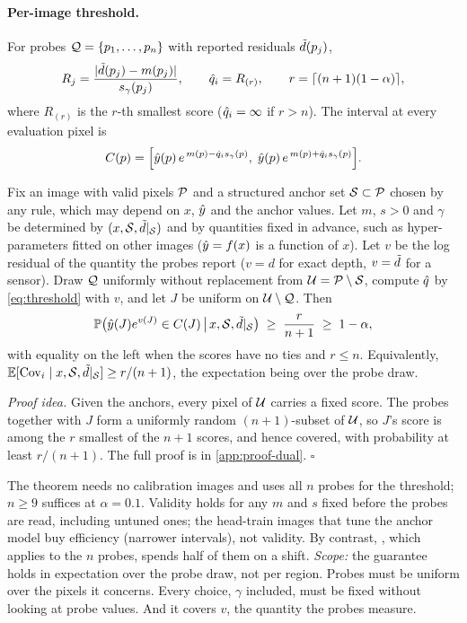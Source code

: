 \paragraph{Per-image threshold.}
For probes $\mathcal{Q}=\{p_1,\dots,p_n\}$ with reported residuals $\tilde{d}(p_j)$,
\begin{equation}
R_j=\frac{|\tilde{d}(p_j)-m(p_j)|}{s_\gamma(p_j)},\qquad\hat{q}_i=R_{(r)},\qquad r=\lceil(n+1)(1-\alpha)\rceil,
\label{eq:threshold}
\end{equation}
where $R_{(r)}$ is the $r$-th smallest score ($\hat{q}_i=\infty$ if $r>n$).
The interval at every evaluation pixel is
\begin{equation}
C(p)=\Big[\hat{y}(p)\,e^{\,m(p)-\hat{q}_i s_\gamma(p)},\;\hat{y}(p)\,e^{\,m(p)+\hat{q}_i s_\gamma(p)}\Big].
\label{eq:interval}
\end{equation}

\begin{theorem}
\label{thm:dual}
Fix an image with valid pixels $\mathcal{P}$ and a structured anchor set $\mathcal{S}\subset\mathcal{P}$ chosen by any rule, which may depend on $x$, $\hat{y}$ and the anchor values.
Let $m$, $s>0$ and $\gamma$ be determined by $(x,\mathcal{S},\tilde{d}|_{\mathcal{S}})$ and by quantities fixed in advance, such as hyper-parameters fitted on other images ($\hat{y}=f(x)$ is a function of $x$).
Let $v$ be the log residual of the quantity the probes report ($v=d$ for exact depth, $v=\tilde{d}$ for a sensor).
Draw $\mathcal{Q}$ uniformly without replacement from $\mathcal{U}=\mathcal{P}\setminus\mathcal{S}$, compute $\hat{q}$ by \cref{eq:threshold} with $v$, and let $J$ be uniform on $\mathcal{U}\setminus\mathcal{Q}$.
Then
\begin{equation*}
\mathbb{P}\big(\hat{y}(J)e^{v(J)}\in C(J)\,\big|\,x,\mathcal{S},\tilde{d}|_{\mathcal{S}}\big)\;\ge\;\frac{r}{n+1}\;\ge\;1-\alpha,
\end{equation*}
with equality on the left when the scores have no ties and $r\le n$.
Equivalently, $\mathbb{E}[\mathrm{Cov}_i\mid x,\mathcal{S},\tilde{d}|_{\mathcal{S}}]\ge r/(n+1)$, the expectation being over the probe draw.
\end{theorem}

\noindent\emph{Proof idea.}
Given the anchors, every pixel of $\mathcal{U}$ carries a fixed score.
The probes together with $J$ form a uniformly random $(n+1)$-subset of $\mathcal{U}$, so $J$'s score is among the $r$ smallest of the $n+1$ scores, and hence covered, with probability at least $r/(n+1)$.
The full proof is in \cref{app:proof-dual}. \hfill$\square$

The theorem needs no calibration images and uses all $n$ probes for the threshold; $n\ge9$ suffices at $\alpha=0.1$.
Validity holds for any $m$ and $s$ fixed before the probes are read, including untuned ones; the head-train images that tune the anchor model buy efficiency (narrower intervals), not validity.
By contrast, \mLocalSplit, which applies \mLocal to the $n$ probes, spends half of them on a shift.
\emph{Scope:} the guarantee holds in expectation over the probe draw, not per region.
Probes must be uniform over the pixels it concerns.
Every choice, $\gamma$ included, must be fixed without looking at probe values.
And it covers $v$, the quantity the probes measure.

